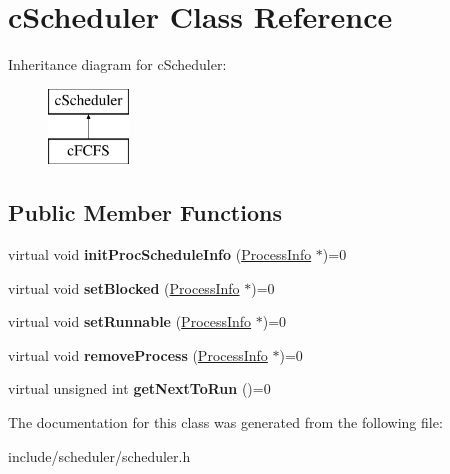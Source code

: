 \hypertarget{classcScheduler}{\section{c\-Scheduler \-Class \-Reference}
\label{d0/d21/classcScheduler}
}
\-Inheritance diagram for c\-Scheduler\-:\begin{figure}[H]
\begin{center}
\leavevmode
\includegraphics[height=2.000000cm]{d0/d21/classcScheduler}
\end{center}
\end{figure}
\subsection*{\-Public \-Member \-Functions}
\begin{DoxyCompactItemize}
\item 
\hypertarget{classcScheduler_abb86834353cf48c1b2b851232ce8615b}{virtual void {\bfseries init\-Proc\-Schedule\-Info} (\hyperlink{structProcessInfo}{\-Process\-Info} $\ast$)=0}\label{d0/d21/classcScheduler_abb86834353cf48c1b2b851232ce8615b}

\item 
\hypertarget{classcScheduler_ab82ffc2909aae9047dd66c28c609abe7}{virtual void {\bfseries set\-Blocked} (\hyperlink{structProcessInfo}{\-Process\-Info} $\ast$)=0}\label{d0/d21/classcScheduler_ab82ffc2909aae9047dd66c28c609abe7}

\item 
\hypertarget{classcScheduler_a0f1e5994d8781681b06fae453fb78b6d}{virtual void {\bfseries set\-Runnable} (\hyperlink{structProcessInfo}{\-Process\-Info} $\ast$)=0}\label{d0/d21/classcScheduler_a0f1e5994d8781681b06fae453fb78b6d}

\item 
\hypertarget{classcScheduler_a16978dd9cebeba3e6d37f0a28a246f96}{virtual void {\bfseries remove\-Process} (\hyperlink{structProcessInfo}{\-Process\-Info} $\ast$)=0}\label{d0/d21/classcScheduler_a16978dd9cebeba3e6d37f0a28a246f96}

\item 
\hypertarget{classcScheduler_abf9efb347bb653b50870ad08ba3f6751}{virtual unsigned int {\bfseries get\-Next\-To\-Run} ()=0}\label{d0/d21/classcScheduler_abf9efb347bb653b50870ad08ba3f6751}

\end{DoxyCompactItemize}


\-The documentation for this class was generated from the following file\-:\begin{DoxyCompactItemize}
\item 
include/scheduler/scheduler.\-h\end{DoxyCompactItemize}
